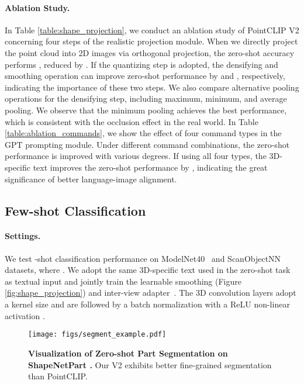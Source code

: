 \documentclass[10pt,twocolumn,letterpaper]{article}
\begin{document}
\vspace{-0.2cm}
\paragraph{Ablation Study.}
In Table \ref{table:shape_projection}, we conduct an ablation study of PointCLIP V2 concerning four steps of the realistic projection module. When we directly project the point cloud into 2D images via orthogonal projection, the zero-shot accuracy performs , reduced by . If the quantizing step is adopted, the densifying and smoothing operation can improve zero-shot performance by  and , respectively, indicating the importance of these two steps. We also compare alternative pooling operations for the densifying step, including maximum, minimum, and average pooling. We observe that the minimum pooling achieves the best performance, which is consistent with the occlusion effect in the real world. In Table \ref{table:ablation_commands}, we show the effect of four command types in the GPT prompting module. Under different command combinations, the zero-shot performance is improved with various degrees. If using all four types, the 3D-specific text improves the zero-shot performance by , indicating the great significance of better language-image alignment.

\subsection{Few-shot Classification}

\paragraph{Settings.} We test -shot classification performance on ModelNet40~\cite{wu20153d} and ScanObjectNN~\cite{uy2019revisiting} datasets, where . We adopt the same 3D-specific text used in the zero-shot task as textual input and jointly train the learnable smoothing (Figure \ref{fig:shape_projection}) and inter-view adapter~\cite{zhang2022pointclip}.
 The 3D convolution layers adopt a  kernel size and are followed by a batch normalization \cite{ioffe2015batch} with a ReLU non-linear activation \cite{nair2010rectified}.

\begin{figure}[t!]
\centering
\texttt{[image: figs/segment\_example.pdf]}
\vspace{0.1cm}
\caption{\textbf{Visualization of Zero-shot Part Segmentation on ShapeNetPart \cite{yi2016scalable}.} Our V2 exhibits better fine-grained segmentation than PointCLIP.}
\label{fig:segment_example}
\end{figure}
\end{document}
